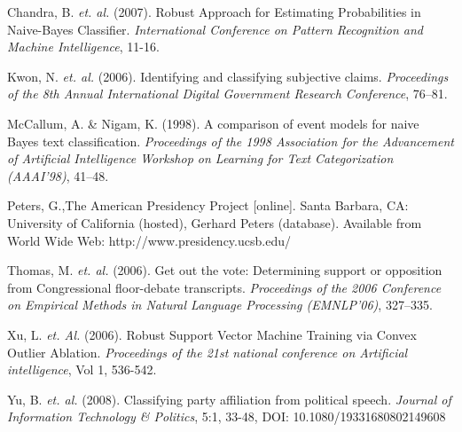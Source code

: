 \documentclass[aps, prl, reprint, showpacs]{revtex4-1}
\begin{document}
\begin{thebibliography}{7}

Chandra, B. \textit{et. al.} (2007). Robust Approach for Estimating Probabilities in Naive-Bayes Classifier. \textit{International Conference on Pattern Recognition and Machine Intelligence}, 11-16.

Kwon, N. \textit{et. al.} (2006). Identifying and classifying subjective claims. \textit{Proceedings of the 8th Annual International Digital Government Research Conference}, 76–81.

McCallum, A. \& Nigam, K. (1998). A comparison of event models for naive Bayes text classification. \textit{Proceedings of the 1998 Association for the Advancement of Artificial Intelligence Workshop on Learning for Text Categorization (AAAI’98)}, 41–48.

Peters, G.,The American Presidency Project [online]. Santa Barbara, CA: University of California (hosted), Gerhard Peters (database). Available from World Wide Web: http://www.presidency.ucsb.edu/

Thomas, M. \textit{et. al.} (2006). Get out the vote: Determining support or opposition from Congressional floor-debate transcripts. \textit{Proceedings of the 2006 Conference on Empirical Methods in Natural Language Processing (EMNLP’06)}, 327–335.

Xu, L. \textit{et. Al.} (2006). Robust Support Vector Machine Training via Convex Outlier Ablation. \textit{Proceedings of the 21st national conference on Artificial intelligence}, Vol 1, 536-542.

Yu, B. \textit{et. al.} (2008). Classifying party affiliation from political speech. \textit{Journal of Information Technology \& Politics}, 5:1, 33-48, DOI: 10.1080/19331680802149608

\end{thebibliography}
\end{document}
